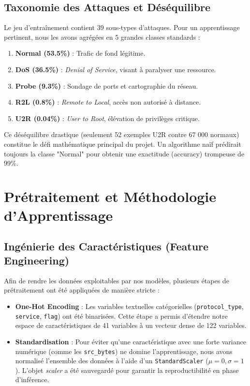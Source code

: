 \documentclass[12pt,a4paper]{report}
\begin{document}
\section{Taxonomie des Attaques et Déséquilibre}
Le jeu d'entraînement contient 39 sous-types d'attaques. Pour un apprentissage pertinent, nous les avons agrégées en 5 grandes classes standards :
\begin{enumerate}
    \item \textbf{Normal (53.5\%)} : Trafic de fond légitime.
    \item \textbf{DoS (36.5\%)} : \textit{Denial of Service}, visant à paralyser une ressource.
    \item \textbf{Probe (9.3\%)} : Sondage de ports et cartographie du réseau.
    \item \textbf{R2L (0.8\%)} : \textit{Remote to Local}, accès non autorisé à distance.
    \item \textbf{U2R (0.04\%)} : \textit{User to Root}, élévation de privilèges critique.
\end{enumerate}
Ce déséquilibre drastique (seulement 52 exemples U2R contre 67 000 normaux) constitue le défi mathématique principal du projet. Un algorithme naïf prédirait toujours la classe "Normal" pour obtenir une exactitude (accuracy) trompeuse de 99\%.

\chapter{Prétraitement et Méthodologie d'Apprentissage}

\section{Ingénierie des Caractéristiques (Feature Engineering)}
Afin de rendre les données exploitables par nos modèles, plusieurs étapes de prétraitement ont été appliquées de manière stricte :
\begin{itemize}
    \item \textbf{One-Hot Encoding} : Les variables textuelles catégorielles (\texttt{protocol\_type}, \texttt{service}, \texttt{flag}) ont été binarisées. Cette étape a permis d'étendre notre espace de caractéristiques de 41 variables à un vecteur dense de 122 variables.
    \item \textbf{Standardisation} : Pour éviter qu'une caractéristique avec une forte variance numérique (comme les \texttt{src\_bytes}) ne domine l'apprentissage, nous avons normalisé l'ensemble des données à l'aide d'un \texttt{StandardScaler} ($ \mu = 0, \sigma = 1 $). L'objet \textit{scaler} a été sauvegardé pour garantir la reproductibilité en phase d'inférence.
\end{itemize}
\end{document}
